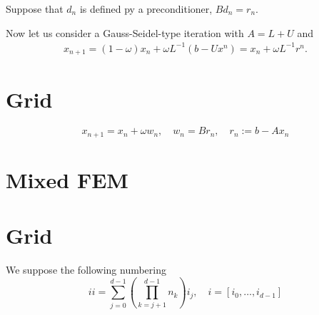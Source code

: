 \documentclass[12pt, english]{article}
\begin{document}
Suppose that $d_n$ is defined py a preconditioner, $B d_n = r_n$.





Now let us consider a Gauss-Seidel-type iteration with $A=L+U$ and
%
\begin{align*}
x_{n+1} = (1-\omega)x_n + \omega L^{-1}(b- U x^n) = x_n +  \omega L^{-1}r^n.
\end{align*}
%


%
\section{Grid}\label{sec:}
%
%
\begin{equation}\label{eq:}
x_{n+1} = x_n + \omega w_n,\quad  w_n = B r_n, \quad r_n := b - A x_n
\end{equation}
%

%
\section{Mixed FEM}\label{sec:}
%

%
\section{Grid}\label{sec:}
%
We suppose the following numbering
%
\begin{equation}\label{eq:}
ii = \sum_{j=0}^{d-1}\left(\prod_{k=j+1}^{d-1}n_k\right) i_j,\quad i=[i_0,\ldots,i_{d-1}]
\end{equation}
%
%
%
\end{document}
